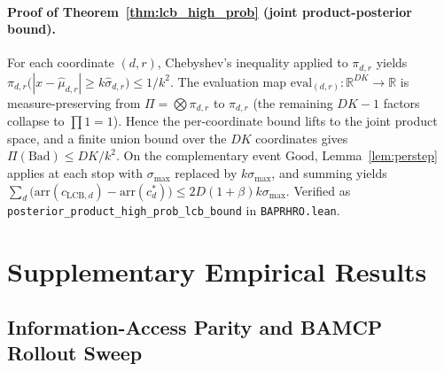 \documentclass[opre,dblanonrev]{informs4}
\begin{document}
\begin{APPENDICES}
\paragraph{Proof of Theorem~\ref{thm:lcb_high_prob} (joint product-posterior bound).}
For each coordinate $(d,r)$, Chebyshev's inequality applied to
$\pi_{d,r}$ yields
$\pi_{d,r}\bigl(|x-\hat\mu_{d,r}|\geq k\hat\sigma_{d,r}\bigr)\leq
1/k^2$. The evaluation map
$\mathrm{eval}_{(d,r)}:\mathbb R^{DK}\to\mathbb R$ is
measure-preserving from $\Pi=\bigotimes\pi_{d,r}$ to $\pi_{d,r}$
(the remaining $DK-1$ factors collapse to $\prod 1=1$). Hence the
per-coordinate bound lifts to the joint product space, and a finite
union bound over the $DK$ coordinates gives
$\Pi(\mathrm{Bad})\leq DK/k^2$. On the complementary event
$\mathrm{Good}$, Lemma~\ref{lem:perstep} applies at each stop with
$\sigma_{\max}$ replaced by $k\sigma_{\max}$, and summing yields
$\sum_d\bigl(\mathrm{arr}(c_{\mathrm{LCB},d})-\mathrm{arr}(c^*_d)\bigr)
\leq 2D(1+\beta)k\sigma_{\max}$. Verified as
\texttt{posterior\_product\_high\_prob\_lcb\_bound} in
\texttt{BAPRHRO.lean}.

\section{Supplementary Empirical Results}
\label{ec:supp_results}

\subsection{Information-Access Parity and BAMCP Rollout Sweep}
\label{ec:fairness_bamcp}


\end{APPENDICES}
\end{document}
